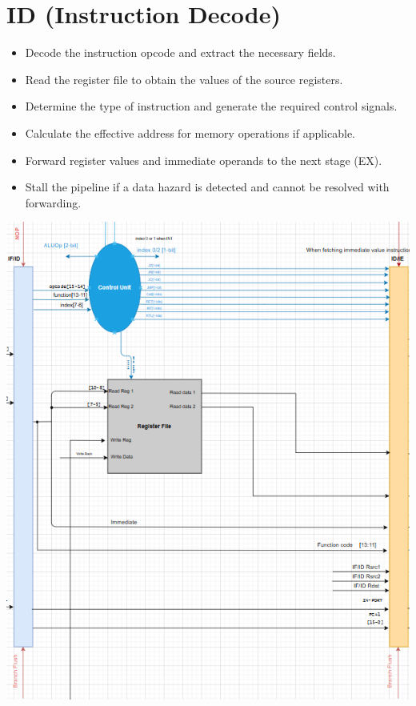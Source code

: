 \documentclass{report}
\begin{document}
\section*{ID (Instruction Decode)}
\begin{minipage}{0.6\textwidth}
\begin{itemize}
    \item Decode the instruction opcode and extract the necessary fields.
    \item Read the register file to obtain the values of the source registers.
    \item Determine the type of instruction and generate the required control signals.
    \item Calculate the effective address for memory operations if applicable.
    \item Forward register values and immediate operands to the next stage (EX).
    \item Stall the pipeline if a data hazard is detected and cannot be resolved with forwarding.
\end{itemize}
\end{minipage}
\hspace{1cm}
\begin{minipage}{0.35\textwidth}
\begin{center}
    \includegraphics[width=\textwidth]{./assets/ID.png}
\end{center}
\end{minipage}
\end{document}
